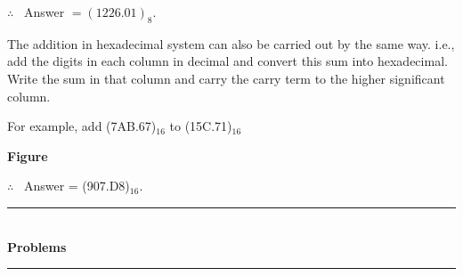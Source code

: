 \noindent
$\therefore$~ Answer $= (1226.01)_{8}$.

\smallskip
{}

The addition in hexadecimal system can also be carried out by the same way. i.e., add the digits in each column in decimal and convert this sum into hexadecimal. Write the sum in that column and carry the carry term to the higher significant column.

For example, add (7AB.67)$_{16}$  to (15C.71)$_{16}$
\begin{center}
{\bf Figure}
\end{center}

\noindent
$\therefore$~ Answer = (907.D8)$_{16}$.

\begin{center}
\rule{4cm}{1pt}\\
{\bf\Large Problems}\\[-3pt]
\rule{4cm}{1pt}
\end{center}




\label{5end}
